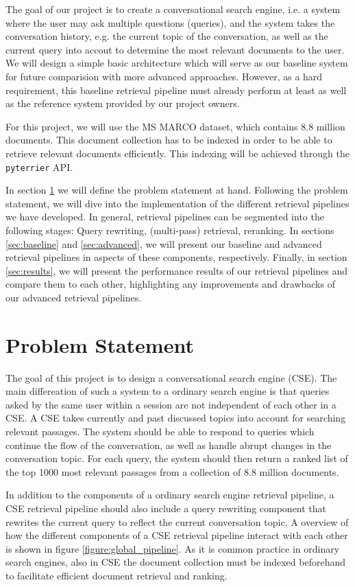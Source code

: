 \documentclass[sigconf]{acmart}
\begin{document}
The goal of our project is to create a conversational search engine, i.e. a system where the user may ask multiple questions (queries), and the system takes the conversation history, e.g. the current topic of the conversation, as well as the current query into accout to determine the most relevant documents to the user. We will design a simple basic architecture which will serve as our baseline system for future comparision with more advanced approaches. However, as a hard requirement, this baseline retrieval pipeline must already perform at least as well as the reference system provided by our project owners.

For this project, we will use the MS MARCO dataset, which contains 8.8 million documents. This document collection has to be indexed in order to be able to retrieve relevant documents efficiently. This indexing will be achieved through the \texttt{pyterrier} API.

In section \ref{sec:problem} we will define the problem statement at hand. Following the problem statement, we will dive into the implementation of the different retrieval pipelines we have developed. In general, retrieval pipelines can be segmented into the following stages: Query rewriting, (multi-pass) retrieval, reranking. In sections \ref{sec:baseline} and \ref{sec:advanced}, we will present our baseline and advanced retrieval pipelines in aspects of these components, respectively. Finally, in section \ref{sec:results}, we will present the performance results of our retrieval pipelines and compare them to each other, highlighting any improvements and drawbacks of our advanced retrieval pipelines.

\section{Problem Statement}\label{sec:problem}
The goal of this project is to design a conversational search engine (CSE). The main differeation of such a system to a ordinary search engine is that queries asked by the same user within a session are not independent of each other in a CSE. A CSE takes currently and past discussed topics into account for searching relevant passages. The system should be able to respond to queries which continue the flow of the conversation, as well as handle abrupt changes in the conversation topic. For each query, the system should then return a ranked list of the top 1000 most relevant passages from a collection of 8.8 million documents.

In addition to the components of a ordinary search engine retrieval pipeline, a CSE retrieval pipeline should also include a query rewriting component that rewrites the current query to reflect the current conversation topic. A overview of how the different components of a CSE retrieval pipeline interact with each other is shown in figure \ref{figure:global_pipeline}. As it is common practice in ordinary search engines, also in CSE the document collection must be indexed beforehand to facilitate efficient document retrieval and ranking.
\end{document}
